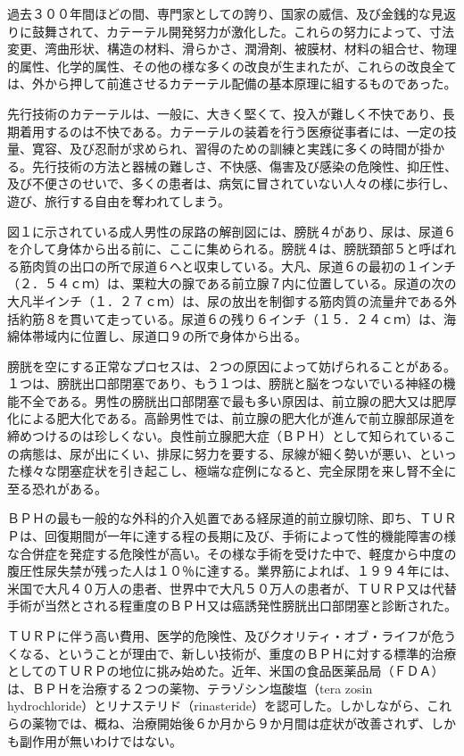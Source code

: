 過去３００年間ほどの間、専門家としての誇り、国家の威信、及び金銭的な見返りに鼓舞されて、カテーテル開発努力が激化した。これらの努力によって、寸法変更、湾曲形状、構造の材料、滑らかさ、潤滑剤、被膜材、材料の組合せ、物理的属性、化学的属性、その他の様な多くの改良が生まれたが、これらの改良全ては、外から押して前進させるカテーテル配備の基本原理に組するものであった。

先行技術のカテーテルは、一般に、大きく堅くて、投入が難しく不快であり、長期着用するのは不快である。カテーテルの装着を行う医療従事者には、一定の技量、寛容、及び忍耐が求められ、習得のための訓練と実践に多くの時間が掛かる。先行技術の方法と器械の難しさ、不快感、傷害及び感染の危険性、抑圧性、及び不便さのせいで、多くの患者は、病気に冒されていない人々の様に歩行し、遊び、旅行する自由を奪われてしまう。

図１に示されている成人男性の尿路の解剖図には、膀胱４があり、尿は、尿道６を介して身体から出る前に、ここに集められる。膀胱４は、膀胱頚部５と呼ばれる筋肉質の出口の所で尿道６へと収束している。大凡、尿道６の最初の１インチ（２．５４ｃｍ）は、栗粒大の腺である前立腺７内に位置している。尿道の次の大凡半インチ（１．２７ｃｍ）は、尿の放出を制御する筋肉質の流量弁である外括約筋８を貫いて走っている。尿道６の残り６インチ（１５．２４ｃｍ）は、海綿体帯域内に位置し、尿道口９の所で身体から出る。

膀胱を空にする正常なプロセスは、２つの原因によって妨げられることがある。１つは、膀胱出口部閉塞であり、もう１つは、膀胱と脳をつないでいる神経の機能不全である。男性の膀胱出口部閉塞で最も多い原因は、前立腺の肥大又は肥厚化による肥大化である。高齢男性では、前立腺の肥大化が進んで前立腺部尿道を締めつけるのは珍しくない。良性前立腺肥大症（ＢＰＨ）として知られているこの病態は、尿が出にくい、排尿に努力を要する、尿線が細く勢いが悪い、といった様々な閉塞症状を引き起こし、極端な症例になると、完全尿閉を来し腎不全に至る恐れがある。

ＢＰＨの最も一般的な外科的介入処置である経尿道的前立腺切除、即ち、ＴＵＲＰは、回復期間が一年に達する程の長期に及び、手術によって性的機能障害の様な合併症を発症する危険性が高い。その様な手術を受けた中で、軽度から中度の腹圧性尿失禁が残った人は１０％に達する。業界筋によれば、１９９４年には、米国で大凡４０万人の患者、世界中で大凡５０万人の患者が、ＴＵＲＰ又は代替手術が当然とされる程重度のＢＰＨ又は癌誘発性膀胱出口部閉塞と診断された。

ＴＵＲＰに伴う高い費用、医学的危険性、及びクオリティ・オブ・ライフが危うくなる、ということが理由で、新しい技術が、重度のＢＰＨに対する標準的治療としてのＴＵＲＰの地位に挑み始めた。近年、米国の食品医薬品局（ＦＤＡ）は、ＢＰＨを治療する２つの薬物、テラゾシン塩酸塩（tera zosin hydrochloride）とリナステリド（rinasteride）を認可した。しかしながら、これらの薬物では、概ね、治療開始後６か月から９か月間は症状が改善されず、しかも副作用が無いわけではない。

